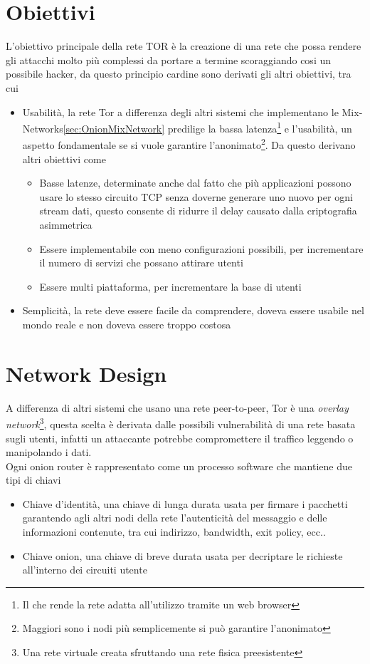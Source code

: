 \section{Obiettivi}
L'obiettivo principale della rete TOR è la creazione di una rete che possa rendere gli attacchi molto più complessi da portare a termine scoraggiando cosi un possibile hacker, da questo principio cardine sono derivati gli altri obiettivi, tra cui
\begin{itemize}
    \item Usabilità, la rete Tor a differenza degli altri sistemi che implementano le Mix-Networks\ref{sec:OnionMixNetwork} predilige la bassa latenza\footnote{Il che rende la rete adatta all'utilizzo tramite un web browser} e l'usabilità, un aspetto fondamentale se si vuole garantire l'anonimato\footnote{Maggiori sono i nodi più semplicemente si può garantire l'anonimato}.
    Da questo derivano altri obiettivi come
    \begin{itemize}
        \item Basse latenze, determinate anche dal fatto che più applicazioni possono usare lo stesso circuito TCP senza doverne generare uno nuovo per ogni stream dati, questo consente di ridurre il delay causato dalla criptografia asimmetrica
        \item Essere implementabile con meno configurazioni possibili, per incrementare il numero di servizi che possano attirare utenti
        \item Essere multi piattaforma, per incrementare la base di utenti
    \end{itemize}
    \item Semplicità, la rete deve essere facile da comprendere, doveva essere usabile nel mondo reale e non doveva essere troppo costosa
\end{itemize}

\cite{ChaumMixes}
\section{Network Design}
A differenza di altri sistemi che usano una rete peer-to-peer, Tor è una \emph{overlay network}\footnote{Una rete virtuale creata sfruttando una rete fisica preesistente}, questa scelta è derivata dalle possibili vulnerabilità di una rete basata sugli utenti, infatti un attaccante potrebbe compromettere il traffico leggendo o manipolando i dati. \\
Ogni onion router è rappresentato come un processo software che mantiene due tipi di chiavi
\begin{itemize}
    \item Chiave d'identità, una chiave di lunga durata usata per firmare i pacchetti garantendo agli altri nodi della rete l'autenticità del messaggio e delle informazioni contenute, tra cui indirizzo, bandwidth, exit policy, ecc..
    \item Chiave onion, una chiave di breve durata usata per decriptare le richieste all'interno dei circuiti utente
\end{itemize}


